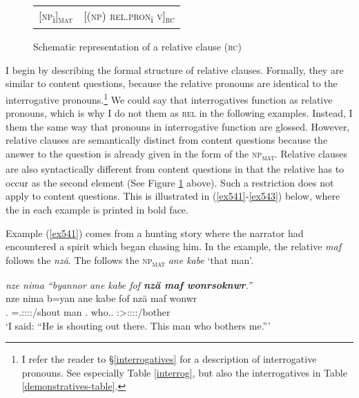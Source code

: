 \begin{figure}[H]
\begin{center}
	\begin{tabular}{ll}
			[\textsc{np}\textsubscript{i}]\textsubscript{\textsc{mat}}& [(\textsc{np}) \textsc{rel.pron}\textsubscript{i} \textsc{v}]\textsubscript{\textsc{rc}}\\
	\end{tabular}
	\caption{Schematic representation of a relative clause (\textsc{rc})}
	\label{relclause}
\end{center}
\end{figure}%

I begin by describing the formal structure of relative clauses. Formally, they are similar to content questions, because the relative pronouns are identical to the interrogative pronouns.\footnote{I refer the reader to \S{}\ref{interrogatives} for a description of interrogative pronouns. See especially Table \ref{interrog}, but also the interrogatives in Table \ref{demonstratives-table}.} We could say that interrogatives function as relative pronouns, which is why I do not  them as \textsc{rel} in the following examples. Instead, I  them the same way that pronouns in interrogative function are glossed. However, relative clauses are semantically distinct from content questions because the answer to the question is already given in the form of the \textsc{np}\textsubscript{\textsc{mat}}. Relative clauses are also syntactically different from content questions in that the relative  has to occur as the second element (See Figure \ref{relclause} above). Such a restriction does not apply to content questions. This is illustrated in (\ref{ex541}-\ref{ex543}) below, where the  in each example is printed in bold face.%

Example (\ref{ex541}) comes from a hunting story where the narrator had encountered a spirit which began chasing him. In the example, the relative  \emph{maf} follows the  \emph{nzä}. The  follows the \textsc{np}\textsubscript{\textsc{mat}} \emph{ane kabe} `that man'.

\begin{exe}
	\ex \emph{nze nima ``byannor ane kabe fof \textbf{nzä maf wonrsoknwr}.''}\\
	\gll nze nima b=yan ane kabe fof nzä maf wonwr\\
	\Fsg.\Erg{} \Quot{} \Med=\Tsg.\Masc:\Sbj:\Nonpast:\Ipfv:\Venit/shout \Dem{} man \Emph{} \Fsg.\Abs{} who.\Sg.\Erg{} \Stsg:\Sbj>\Fsg:\Obj:\Nonpast:\Ipfv:\Venit/bother\\
	\trans `I said: ``He is shouting out there. This man who bothers me.'''\\
	\label{ex541}
\end{exe}

